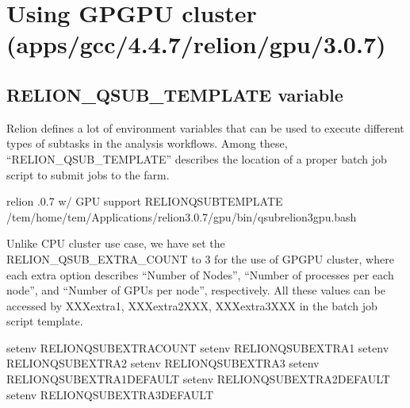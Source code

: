 \documentclass[letterpaper,10pt,english]{sphinxmanual}
\begin{document}
\section{Using GPGPU cluster (apps/gcc/4.4.7/relion/gpu/3.0.7)}
\label{\detokenize{relion:using-gpgpu-cluster-apps-gcc-4-4-7-relion-gpu-3-0-7}}

\subsection{RELION\_QSUB\_TEMPLATE variable}
\label{\detokenize{relion:id1}}
Relion defines a lot of environment variables that can be used to execute different types of subtasks in the analysis workflows. Among these, “RELION\_QSUB\_TEMPLATE” describes the location of a proper batch job script to submit jobs to the farm.

\begin{sphinxVerbatim}[commandchars=\\\{\}]
 relion .0.7 w/ GPU support RELION\PYGZus{}QSUB\PYGZus{}TEMPLATE /tem/home/tem/\PYGZus{}Applications/relion\PYGZhy{}3.0.7/gpu/bin/qsub\PYGZhy{}relion3\PYGZhy{}gpu.bash
\end{sphinxVerbatim}

Unlike CPU cluster use case, we have set the RELION\_QSUB\_EXTRA\_COUNT to 3 for the use of GPGPU cluster,
where each extra option describes “Number of Nodes”, “Number of processes per each node”, and “Number of GPUs per node”, respectively. All these values can be accessed by XXXextra1, XXXextra2XXX, XXXextra3XXX in the batch job script template.

\begin{sphinxVerbatim}[commandchars=\\\{\}]
setenv RELION\PYGZus{}QSUB\PYGZus{}EXTRA\PYGZus{}COUNT 
setenv RELION\PYGZus{}QSUB\PYGZus{}EXTRA1 
setenv RELION\PYGZus{}QSUB\PYGZus{}EXTRA2 
setenv RELION\PYGZus{}QSUB\PYGZus{}EXTRA3 
setenv RELION\PYGZus{}QSUB\PYGZus{}EXTRA1\PYGZus{}DEFAULT 
setenv RELION\PYGZus{}QSUB\PYGZus{}EXTRA2\PYGZus{}DEFAULT 
setenv RELION\PYGZus{}QSUB\PYGZus{}EXTRA3\PYGZus{}DEFAULT 
\end{sphinxVerbatim}

\end{document}
